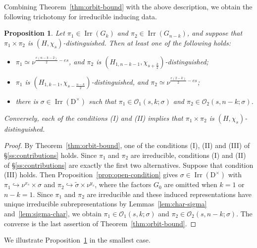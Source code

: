 \documentclass[11pt]{amsart}
\numberwithin{equation}{section}
\theoremstyle{plain}
\newtheorem{proposition}[theorem]{Proposition}
\theoremstyle{definition}
\theoremstyle{remark}
\DeclareMathOperator{\Irr}{Irr}
\begin{document}
Combining Theorem~\ref{thm:orbit-bound} with the above description, we obtain the following trichotomy for irreducible inducing data.

\begin{proposition}\label{prop:three-alternatives}
	Let $\pi_1\in\Irr(G_k)$ and $\pi_2\in\Irr(G_{n-k})$, and suppose that $\pi_1\times\pi_2$ is $(H,\chi_s)$-distinguished. Then at least one of the following holds:
	\begin{itemize}
		\item[(I)] $\pi_1\simeq\nu^{\frac{e(n-k-2)}2-es}$, and $\pi_2$ is $(H_{1,n-k-1},\chi_{s+\frac k2})$-distinguished;
		\item[(II)] $\pi_1$ is $(H_{1,k-1},\chi_{s-\frac{n-k}2})$-distinguished, and $\pi_2\simeq\nu^{\frac{e(2-k)}2-es}$;
		\item[(III)] there is $\sigma\in\Irr(\mathrm{D}^\times)$ such that $\pi_1\in\mathcal O_1(s,k;\sigma)$ and $\pi_2\in\mathcal O_2(s,n-k;\sigma)$.
	\end{itemize}
	Conversely, each of the conditions \textup{(I)} and \textup{(II)} implies that $\pi_1\times\pi_2$ is $(H,\chi_s)$-distinguished.
\end{proposition}

\begin{proof}
	By Theorem~\ref{thm:orbit-bound}, one of the conditions (I), (II) and (III) of \S\ref{ss:contributions} holds. Since $\pi_1$ and $\pi_2$ are irreducible, conditions (I) and (II) of \S\ref{ss:contributions} are exactly the first two alternatives. Suppose that condition (III) holds. Then Proposition~\ref{prop:open-condition} gives $\sigma\in\Irr(\mathrm{D}^\times)$ with $\pi_1\hookrightarrow\nu^{x_s}\times\sigma$ and $\pi_2\hookrightarrow\widetilde\sigma\times\nu^{y_s}$, where the factors $G_0$ are omitted when $k=1$ or $n-k=1$. Since $\pi_1$ and $\pi_2$ are irreducible and these induced representations have unique irreducible subrepresentations by Lemmas~\ref{lem:char-sigma} and~\ref{lem:sigma-char}, we obtain $\pi_1\in\mathcal O_1(s,k;\sigma)$ and $\pi_2\in\mathcal O_2(s,n-k;\sigma)$. The converse is the last assertion of Theorem~\ref{thm:orbit-bound}.
\end{proof}

We illustrate Proposition~\ref{prop:three-alternatives} in the smallest case.
\end{document}
